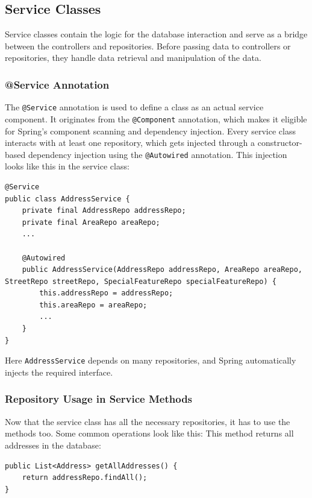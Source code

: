     \subsection{Service Classes}
    Service classes contain the logic for the database interaction and serve as a bridge between the controllers and repositories. Before passing data to controllers or repositories, they handle data retrieval and manipulation of the data.

    \subsubsection{@Service Annotation}
    The \texttt{@Service} annotation is used to define a class as an actual service component. It originates from the \texttt{@Component} annotation, which makes it eligible for Spring's component scanning and dependency injection. \newline
    Every service class interacts with at least one repository, which gets injected through a constructor-based dependency injection using the \texttt{@Autowired} annotation. This injection looks like this in the service class: 
    \begin{verbatim}
@Service
public class AddressService {        
    private final AddressRepo addressRepo;
    private final AreaRepo areaRepo;
    ...

    @Autowired
    public AddressService(AddressRepo addressRepo, AreaRepo areaRepo, StreetRepo streetRepo, SpecialFeatureRepo specialFeatureRepo) {
        this.addressRepo = addressRepo;
        this.areaRepo = areaRepo;
        ...
    }
}
    \end{verbatim}
    Here \texttt{AddressService} depends on many repositories, and Spring automatically injects the required interface. 

    \subsubsection{Repository Usage in Service Methods}
    Now that the service class has all the necessary repositories, it has to use the methods too. Some common operations look like this: \newline
    This method returns all addresses in the database: 
    \begin{verbatim}
public List<Address> getAllAddresses() {
    return addressRepo.findAll();
}
    \end{verbatim}

